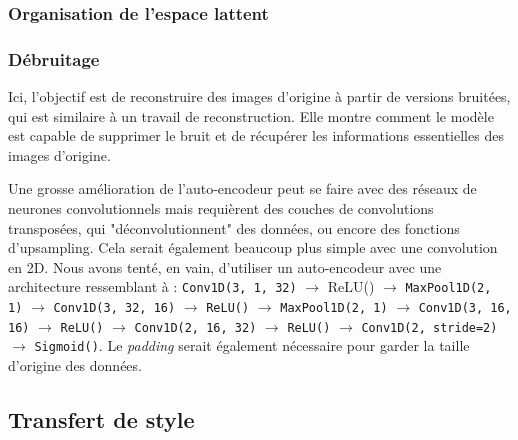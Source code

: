 \documentclass{article}
\begin{document}
\subsubsection{Organisation de l'espace lattent}


\subsubsection{Débruitage}

Ici, l'objectif est de reconstruire des images d'origine à partir de versions bruitées, qui est similaire à un travail de reconstruction. Elle montre comment le modèle est capable de supprimer le bruit et de récupérer les informations essentielles des images d'origine.



Une grosse amélioration de l'auto-encodeur peut se faire avec des réseaux de neurones convolutionnels mais requièrent des couches de convolutions transposées, qui "déconvolutionnent" des données, ou encore des fonctions d'upsampling. Cela serait également beaucoup plus simple avec une convolution en 2D. Nous avons tenté, en vain, d'utiliser un auto-encodeur avec une architecture ressemblant à : \texttt{Conv1D(3, 1, 32)} $\rightarrow$ {ReLU()} $\rightarrow$ \texttt{MaxPool1D(2, 1)} $\rightarrow$ \texttt{Conv1D(3, 32, 16)} $\rightarrow$ \texttt{ReLU()} $\rightarrow$ \texttt{MaxPool1D(2, 1)} $\rightarrow$ \texttt{Conv1D(3, 16, 16)} $\rightarrow$ \texttt{ReLU()} $\rightarrow$ \texttt{Conv1D(2, 16, 32)} $\rightarrow$ \texttt{ReLU()} $\rightarrow$ \texttt{Conv1D(2, stride=2)} $\rightarrow$ \texttt{Sigmoid()}. Le \textit{padding} serait également nécessaire pour garder la taille d'origine des données.


\subsection{Transfert de style}
\end{document}
